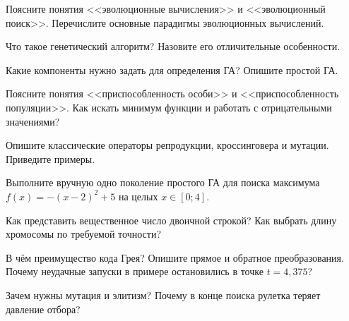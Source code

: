 \begin{questions}
\item Поясните понятия <<эволюционные вычисления>> и <<эволюционный поиск>>. Перечислите основные
парадигмы эволюционных вычислений.
\item Что такое генетический алгоритм? Назовите его отличительные особенности.
\item Какие компоненты нужно задать для определения ГА? Опишите простой ГА.
\item Поясните понятия <<приспособленность особи>> и <<приспособленность популяции>>. Как искать
минимум функции и работать с отрицательными значениями?
\item Опишите классические операторы репродукции, кроссинговера и мутации. Приведите примеры.
\item Выполните вручную одно поколение простого ГА для поиска максимума $f(x) = -(x - 2)^2 + 5$ на целых
$x \in [0; 4]$.
\item Как представить вещественное число двоичной строкой? Как выбрать длину хромосомы по требуемой
точности?
\item В чём преимущество кода Грея? Опишите прямое и обратное преобразования. Почему неудачные запуски
в примере остановились в точке $t = 4,375$?
\item Зачем нужны мутация и элитизм? Почему в конце поиска рулетка теряет давление отбора?
\end{questions}
